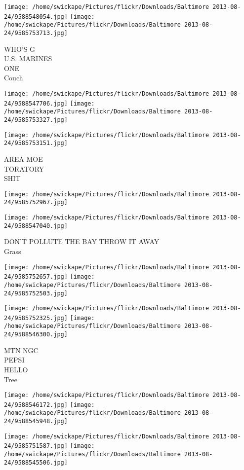 \documentclass[10pt,letterpaper]{article}
\begin{document}
\texttt{[image: /home/swickape/Pictures/flickr/Downloads/Baltimore 2013-08-24/9588548054.jpg]}
\texttt{[image: /home/swickape/Pictures/flickr/Downloads/Baltimore 2013-08-24/9585753713.jpg]}

WHO'S G\\
U.S. MARINES\\
ONE\\
Couch
\pagebreak

\texttt{[image: /home/swickape/Pictures/flickr/Downloads/Baltimore 2013-08-24/9588547706.jpg]}
\texttt{[image: /home/swickape/Pictures/flickr/Downloads/Baltimore 2013-08-24/9585753327.jpg]}

\texttt{[image: /home/swickape/Pictures/flickr/Downloads/Baltimore 2013-08-24/9585753151.jpg]}

AREA MOE\\
TORATORY\\
SHIT
\pagebreak

\texttt{[image: /home/swickape/Pictures/flickr/Downloads/Baltimore 2013-08-24/9585752967.jpg]}

\vspace{0.25in}
\texttt{[image: /home/swickape/Pictures/flickr/Downloads/Baltimore 2013-08-24/9588547040.jpg]}

DON'T POLLUTE THE BAY THROW IT AWAY\\
Grass
\pagebreak

\texttt{[image: /home/swickape/Pictures/flickr/Downloads/Baltimore 2013-08-24/9585752657.jpg]}
\texttt{[image: /home/swickape/Pictures/flickr/Downloads/Baltimore 2013-08-24/9585752503.jpg]}

\texttt{[image: /home/swickape/Pictures/flickr/Downloads/Baltimore 2013-08-24/9585752325.jpg]}
\texttt{[image: /home/swickape/Pictures/flickr/Downloads/Baltimore 2013-08-24/9588546300.jpg]}

MTN NGC\\
PEPSI\\
HELLO\\
Tree
\pagebreak

\texttt{[image: /home/swickape/Pictures/flickr/Downloads/Baltimore 2013-08-24/9588546172.jpg]}
\texttt{[image: /home/swickape/Pictures/flickr/Downloads/Baltimore 2013-08-24/9588545948.jpg]}

\texttt{[image: /home/swickape/Pictures/flickr/Downloads/Baltimore 2013-08-24/9585751587.jpg]}
\texttt{[image: /home/swickape/Pictures/flickr/Downloads/Baltimore 2013-08-24/9588545506.jpg]}
\end{document}
